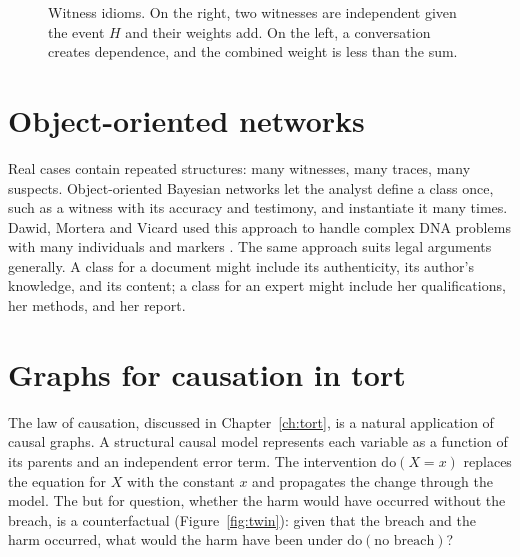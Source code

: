 \begin{figure}[t]
\centering
{}
\caption{Witness idioms. On the right, two witnesses are independent given the event $H$ and their weights add. On the left, a conversation creates dependence, and the combined weight is less than the sum.}
\label{fig:witness}
\end{figure}

\section{Object-oriented networks}

Real cases contain repeated structures: many witnesses, many traces, many suspects. Object-oriented Bayesian networks let the analyst define a class once, such as a witness with its accuracy and testimony, and instantiate it many times. Dawid, Mortera and Vicard used this approach to handle complex DNA problems with many individuals and markers \citep{dawid2007oobn}. The same approach suits legal arguments generally. A class for a document might include its authenticity, its author's knowledge, and its content; a class for an expert might include her qualifications, her methods, and her report.

\section{Graphs for causation in tort}

The law of causation, discussed in Chapter~\ref{ch:tort}, is a natural application of causal graphs. A structural causal model represents each variable as a function of its parents and an independent error term. The intervention $\mathrm{do}(X = x)$ replaces the equation for $X$ with the constant $x$ and propagates the change through the model. The but for question, whether the harm would have occurred without the breach, is a counterfactual (Figure~\ref{fig:twin}): given that the breach and the harm occurred, what would the harm have been under $\mathrm{do}(\text{no breach})$?

